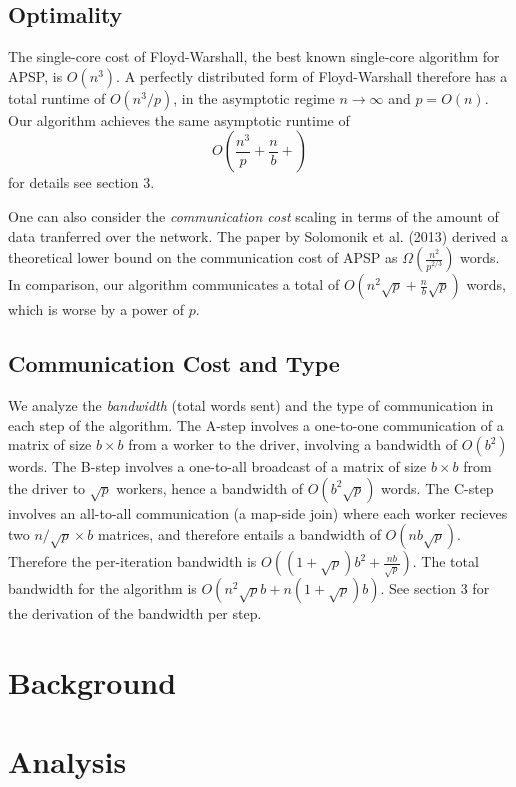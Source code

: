 \documentclass{article} %
\begin{document}
\subsection{Optimality}

The single-core cost of Floyd-Warshall, the best known single-core
algorithm for APSP, is $O(n^3)$.  A perfectly distributed form of
Floyd-Warshall therefore has a total runtime of $O(n^3/p)$, in the
asymptotic regime $n \to \infty$ and $p = O(n)$.  Our algorithm
achieves the same asymptotic runtime of
\[
O\left(\frac{n^3}{p} + \frac{n}{b} + \right)
\]
for details see section 3.

One can also consider the \emph{communication cost} scaling in terms
of the amount of data tranferred over the network.  The paper by
Solomonik et al. (2013) derived a theoretical lower bound on the
communication cost of APSP as $\Omega(\frac{n^2}{p^{2/3}})$ words.  In
comparison, our algorithm communicates a total of $O(n^2\sqrt{p} + \frac{n}{b}\sqrt{p})$
words, which is worse by a power of $p$.

\subsection{Communication Cost and Type}

We analyze the \emph{bandwidth} (total words sent) and the type of
communication in each step of the algorithm.  The A-step involves a
one-to-one communication of a matrix of size $b \times b$ from a
worker to the driver, involving a bandwidth of $O(b^2)$ words.  The
B-step involves a one-to-all broadcast of a matrix of size $b\times b$
from the driver to $\sqrt{p}$ workers, hence a bandwidth of $O(b^2
\sqrt{p})$ words.  The C-step involves an all-to-all communication (a
map-side join) where each worker recieves two $n/\sqrt{p} \times b$
matrices, and therefore entails a bandwidth of $O(nb\sqrt{p})$.
Therefore the per-iteration bandwidth is $O((1 + \sqrt{p})b^2 +
\frac{nb}{\sqrt{p}})$.  The total bandwidth for the algorithm is
$O(n^2\sqrt{p}b + n(1+\sqrt{p})b)$.  See section 3 for the derivation
of the bandwidth per step.

\section{Background}

\section{Analysis}
\end{document}
